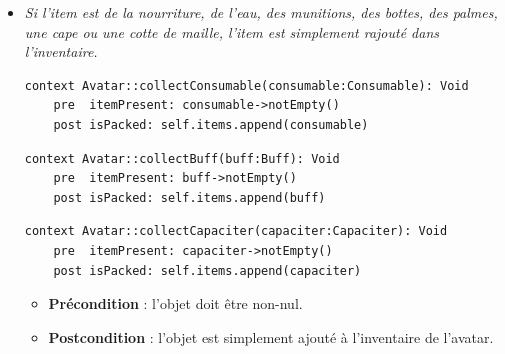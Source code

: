 \documentclass[oneside,a4paper]{book}
\begin{document}
\begin{itemize}
    \item \textit{Si l'item est de la nourriture, de l'eau, des munitions, des bottes, des palmes, une cape ou une cotte de maille, l'item est simplement rajouté dans l'inventaire.}
\begin{minipage}{\linewidth}
    \begin{lstlisting}
context Avatar::collectConsumable(consumable:Consumable): Void
    pre  itemPresent: consumable->notEmpty()
    post isPacked: self.items.append(consumable)
    \end{lstlisting}
\end{minipage}
\begin{minipage}{\linewidth}
    \begin{lstlisting}
context Avatar::collectBuff(buff:Buff): Void
    pre  itemPresent: buff->notEmpty()
    post isPacked: self.items.append(buff)
    \end{lstlisting}
\end{minipage}
\begin{minipage}{\linewidth}
    \begin{lstlisting}
context Avatar::collectCapaciter(capaciter:Capaciter): Void
    pre  itemPresent: capaciter->notEmpty()
    post isPacked: self.items.append(capaciter)
    \end{lstlisting}
\end{minipage}
\begin{itemize}
    \item \textbf{Précondition} : l'objet doit être non-nul.
    \item \textbf{Postcondition} : l'objet est simplement ajouté à l'inventaire de l'avatar.
\end{itemize}

\end{itemize}
\end{document}
